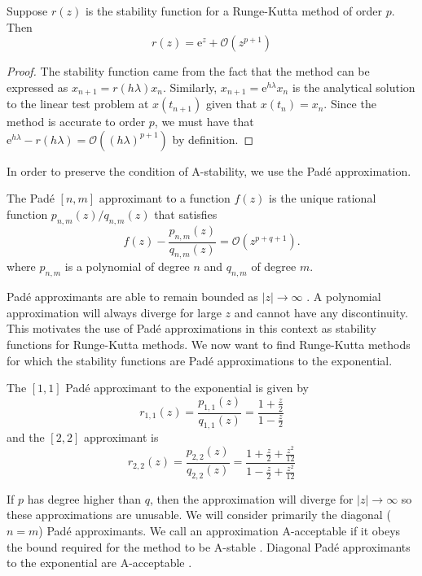 \begin{lemma}
	\label{lem:stabrkisexp}
	Suppose $r(z)$ is the stability function for a Runge-Kutta method of order $p$. Then
	\begin{equation*}
		r(z) = \mathrm{e}^z + \mathcal{O}(z^{p+1})
	\end{equation*}
\end{lemma}
\begin{proof}
	The stability function came from the fact that the method can be expressed as $x_{n+1} = r(h \lambda) x_n$.
	Similarly, $x_{n+1} = \mathrm{e}^{h \lambda} x_n$ is the analytical solution to the linear test problem at $x(t_{n+1})$ given that $x(t_n) = x_n$.
	Since the method is accurate to order $p$, we must have that $\mathrm{e}^{h \lambda} - r(h \lambda) = \mathcal{O}((h \lambda)^{p+1})$ by definition.
\end{proof}
In order to preserve the condition of A-stability, we use the Pad\'e approximation.
\begin{definition}
	The Pad\'e $[n,m]$ approximant to a function $f(z)$ is the unique rational function $p_{n,m}(z)/q_{n,m}(z)$ that satisfies
	\begin{equation*}
		f(z) - \frac{p_{n,m}(z)}{q_{n,m}(z)} = \mathcal{O}(z^{p+q+1}).
	\end{equation*}
	where $p_{n,m}$ is a polynomial of degree $n$ and $q_{n,m}$ of degree $m$.
\end{definition}
Pad\'e approximants are able to remain bounded as $|z| \rightarrow \infty$ \cite{wanner1978order}.
A polynomial approximation will always diverge for large $z$ and cannot have any discontinuity.
This motivates the use of Pad\'e approximations in this context as stability functions for Runge-Kutta methods.
We now want to find Runge-Kutta methods for which the stability functions are Pad\'e approximations to the exponential.
\begin{remark}
	The $[1,1]$ Pad\'e approximant to the exponential is given by
	\begin{equation*}
		r_{1,1}(z) = \frac{p_{1,1}(z)}{q_{1,1}(z)} = \frac{1 + \frac{z}{2}}{1 - \frac{z}{2}}
	\end{equation*}
	and the $[2,2]$ approximant is
	\begin{equation*}
		r_{2,2}(z) = \frac{p_{2,2}(z)}{q_{2,2}(z)} = \frac{1 + \frac{z}{2} + \frac{z^2}{12}}{1 - \frac{z}{2} + \frac{z^2}{12}}
	\end{equation*}
\end{remark}
If $p$ has degree higher than $q$, then the approximation will diverge for $|z| \rightarrow \infty$ so these approximations are unusable.
We will consider primarily the diagonal ($n=m$) Pad\'e approximants.
We call an approximation A-acceptable if it obeys the bound required for the method to be A-stable \cite{iserles2009rk}.
Diagonal Pad\'e approximants to the exponential are A-acceptable \cite{wanner1978order}.

